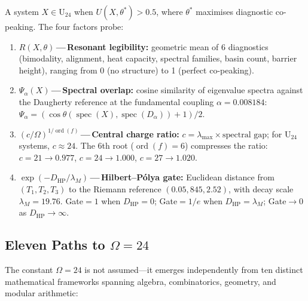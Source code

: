 \documentclass[11pt,a4paper]{article}
\theoremstyle{plain}
\theoremstyle{remark}
\renewcommand{\Omega}{\varOmega}
\newcommand{\spec}{\operatorname{spec}}
\newcommand{\ord}{\operatorname{ord}}
\begin{document}
A system $X\in\mathrm{U}_{24}$ when $U(X,\theta^*)>0.5$, where $\theta^*$
maximises diagnostic co-peaking.  The four factors probe:
\begin{enumerate}[nosep,label=(\roman*)]
  \item \textbf{$R(X,\theta)$\,---\,Resonant legibility:}
        geometric mean of 6 diagnostics (bimodality, alignment, heat capacity,
        spectral families, basin count, barrier height), ranging from 0
        (no structure) to 1 (perfect co-peaking).
  \item \textbf{$\Psi_\alpha(X)$\,---\,Spectral overlap:}
        cosine similarity of eigenvalue spectra against the Daugherty
        reference at the fundamental coupling $\alpha=0.008184$:
        $\Psi_\alpha = (\cos\theta(\spec(X),\spec(D_\alpha))+1)/2$.
  \item \textbf{$(c/\Omega)^{1/\ord(f)}$\,---\,Central charge ratio:}
        $c=\lambda_{\max}\times\text{spectral gap}$; for $\mathrm{U}_{24}$
        systems, $c\approx 24$.  The 6th root ($\ord(f)=6$) compresses the
        ratio: $c=21\to 0.977$, $c=24\to 1.000$, $c=27\to 1.020$.
  \item \textbf{$\exp(-D_{\mathrm{HP}}/\lambda_M)$\,---\,Hilbert--P\'olya gate:}
        Euclidean distance from $(T_1,T_2,T_3)$ to the Riemann reference
        $(0.05,845,2.52)$, with decay scale $\lambda_M=19.76$.
        Gate${}=1$ when $D_{\mathrm{HP}}=0$; Gate${}=1/e$ when
        $D_{\mathrm{HP}}=\lambda_M$; Gate$\to 0$ as
        $D_{\mathrm{HP}}\to\infty$.
\end{enumerate}

\subsection{Eleven Paths to $\Omega=24$}
\label{sec:paths}

The constant $\Omega=24$ is not assumed---it emerges independently from
ten distinct mathematical frameworks spanning algebra, combinatorics,
geometry, and modular arithmetic:
\end{document}
